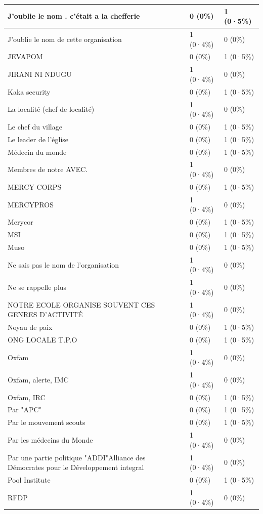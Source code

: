 \documentclass[
]{book}
\begin{document}
\begin{tabular}{l|l|l}
\hline
J'oublie le nom . c'était a la chefferie & 0 (0\%) & 1 (0·5\%)\\
\hline
J'oublie le nom de cette organisation & 1 (0·4\%) & 0 (0\%)\\
\hline
JEVAPOM & 0 (0\%) & 1 (0·5\%)\\
\hline
JIRANI NI NDUGU & 1 (0·4\%) & 0 (0\%)\\
\hline
Kaka security & 0 (0\%) & 1 (0·5\%)\\
\hline
La localité (chef de localité) & 1 (0·4\%) & 0 (0\%)\\
\hline
Le chef du village & 0 (0\%) & 1 (0·5\%)\\
\hline
Le leader de l'église & 0 (0\%) & 1 (0·5\%)\\
\hline
Médecin du monde & 0 (0\%) & 1 (0·5\%)\\
\hline
Membres de notre AVEC. & 1 (0·4\%) & 0 (0\%)\\
\hline
MERCY CORPS & 0 (0\%) & 1 (0·5\%)\\
\hline
MERCYPROS & 1 (0·4\%) & 0 (0\%)\\
\hline
Merycor & 0 (0\%) & 1 (0·5\%)\\
\hline
MSI & 0 (0\%) & 1 (0·5\%)\\
\hline
Muso & 0 (0\%) & 1 (0·5\%)\\
\hline
Ne sais pas le nom de l'organisation & 1 (0·4\%) & 0 (0\%)\\
\hline
Ne se rappelle plus & 1 (0·4\%) & 0 (0\%)\\
\hline
NOTRE ECOLE ORGANISE SOUVENT CES GENRES D'ACTIVITÉ & 1 (0·4\%) & 0 (0\%)\\
\hline
Noyau de paix & 0 (0\%) & 1 (0·5\%)\\
\hline
ONG LOCALE T.P.O & 0 (0\%) & 1 (0·5\%)\\
\hline
Oxfam & 1 (0·4\%) & 0 (0\%)\\
\hline
Oxfam, alerte, IMC & 1 (0·4\%) & 0 (0\%)\\
\hline
Oxfam, IRC & 0 (0\%) & 1 (0·5\%)\\
\hline
Par "APC" & 0 (0\%) & 1 (0·5\%)\\
\hline
Par le mouvement scouts & 0 (0\%) & 1 (0·5\%)\\
\hline
Par les médecins du Monde & 1 (0·4\%) & 0 (0\%)\\
\hline
Par une partie politique "ADDI"Alliance des Démocrates pour le Développement integral & 1 (0·4\%) & 0 (0\%)\\
\hline
Pool Institute & 0 (0\%) & 1 (0·5\%)\\
\hline
RFDP & 1 (0·4\%) & 0 (0\%)\\

\end{tabular}
\end{document}
